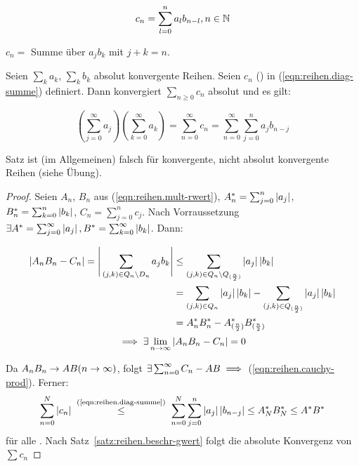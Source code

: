 \documentclass[12pt]{scrreprt}
\begin{document}
\begin{equation}\label{eqn:reihen.diag-summe}
c_n = \sum_{l=0}^n a_lb_{n-l}, n \in \mathbb{N}
\end{equation}

$c_n = $ Summe über $a_jb_k$ mit $j+k = n$.

\begin{satz}\label{satz:reihen.cauchy-prod}
Seien $\sum_k a_k$, $\sum_k b_k$ absolut konvergente Reihen. Seien $c_n$ () in (\ref{eqn:reihen.diag-summe}) definiert.
Dann konvergiert $\sum_{n\ge0} c_n$ absolut und es gilt:

\begin{equation}\label{eqn:reihen.cauchy-prod}
\left(\sum_{j=0}^\infty a_j\right)\left(\sum_{k=0}^\infty a_k\right) = \sum_{n=0}^\infty c_n = \sum_{n=0}^\infty \sum_{j=0}^n a_jb_{n-j}
\end{equation}
\end{satz}

\begin{bem*}
Satz ist (im Allgemeinen) falsch für konvergente, nicht absolut konvergente Reihen (siehe Übung).
\end{bem*}

\begin{proof}
Seien $A_n$, $B_n$ aus (\ref{eqn:reihen.mult-rwert}), $A_n^* = \sum_{j=0}^n \left\lvert a_j\right\lvert$, $B_n^* = \sum_{k=0}^n \left\lvert b_k\right\lvert$,
$C_n = \sum_{j=0}^n c_j$. Nach Vorraussetzung $\exists A^* = \sum_{j=0}^\infty \left\lvert a_j\right\lvert, B^* = \sum_{k=0}^\infty \left\lvert b_k\right\lvert$.
Dann:

\begin{align*}
\left\lvert A_nB_n - C_n\right\lvert = \Bigg\lvert\sum_{(j,k)\in Q_n\setminus D_n} a_jb_k\Bigg\lvert &\le 
	\sum_{(j,k)\in Q_n\setminus Q_{(\frac{n}{2})}} \left\lvert a_j\right\lvert\left\lvert b_k\right\lvert \\
	&= \sum_{(j,k)\in Q_n} \left\lvert a_j\right\lvert\left\lvert b_k\right\lvert - \sum_{(j,k)\in Q_{(\frac{n}{2})}} \left\lvert a_j\right\lvert\left\lvert b_k\right\lvert\\
	&= A_n^*B_n^* - A_{(\frac{n}{2})}^*B_{(\frac{n}{2})}^*
\end{align*}
\[\implies \exists\lim_{n\rightarrow\infty} \left\lvert A_nB_n - C_n\right\lvert = 0\]

Da $A_nB_n \rightarrow AB (n\rightarrow\infty)$, folgt $\exists\sum_{n=0}^\infty C_n - AB \implies$ (\ref{eqn:reihen.cauchy-prod}).
Ferner: \[\sum_{n=0}^N \abs{c_n} \nach{\le}{(\ref{eqn:reihen.diag-summe})}
\sum_{n=0}^N\sum_{j=0}^n \abs{a_j}\abs{b_{n-j}} \le %
A_N^*B_N^* \le A^*B^*\] für alle . Nach Satz~\ref{satz:reihen.beschr-gwert} folgt die absolute Konvergenz von $\sum c_n$
\end{proof}
\end{document}
